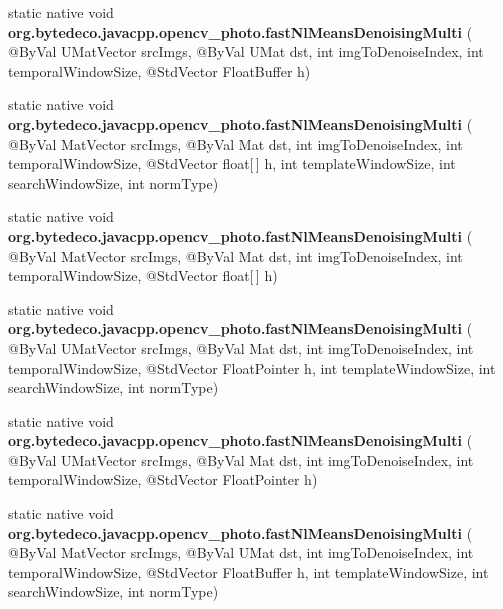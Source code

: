 \begin{DoxyCompactItemize}
\item 
\mbox{\label{group__photo__denoise_ga49b37d9587d0f6964fc23e71b349bc34}} 
static native void {\bfseries org.\+bytedeco.\+javacpp.\+opencv\+\_\+photo.\+fast\+Nl\+Means\+Denoising\+Multi} ( @By\+Val U\+Mat\+Vector src\+Imgs, @By\+Val U\+Mat dst, int img\+To\+Denoise\+Index, int temporal\+Window\+Size, @Std\+Vector Float\+Buffer h)
\item 
\mbox{\label{group__photo__denoise_ga29658724b489fd90f43a9918c06cd442}} 
static native void {\bfseries org.\+bytedeco.\+javacpp.\+opencv\+\_\+photo.\+fast\+Nl\+Means\+Denoising\+Multi} ( @By\+Val Mat\+Vector src\+Imgs, @By\+Val Mat dst, int img\+To\+Denoise\+Index, int temporal\+Window\+Size, @Std\+Vector float\mbox{[}$\,$\mbox{]} h, int template\+Window\+Size, int search\+Window\+Size, int norm\+Type)
\item 
\mbox{\label{group__photo__denoise_ga6403e7b0af533cf0ea82826d33877cb2}} 
static native void {\bfseries org.\+bytedeco.\+javacpp.\+opencv\+\_\+photo.\+fast\+Nl\+Means\+Denoising\+Multi} ( @By\+Val Mat\+Vector src\+Imgs, @By\+Val Mat dst, int img\+To\+Denoise\+Index, int temporal\+Window\+Size, @Std\+Vector float\mbox{[}$\,$\mbox{]} h)
\item 
\mbox{\label{group__photo__denoise_ga82df6920e1bd487e9a47c396aa5dd25e}} 
static native void {\bfseries org.\+bytedeco.\+javacpp.\+opencv\+\_\+photo.\+fast\+Nl\+Means\+Denoising\+Multi} ( @By\+Val U\+Mat\+Vector src\+Imgs, @By\+Val Mat dst, int img\+To\+Denoise\+Index, int temporal\+Window\+Size, @Std\+Vector Float\+Pointer h, int template\+Window\+Size, int search\+Window\+Size, int norm\+Type)
\item 
\mbox{\label{group__photo__denoise_ga06ad37e3fde65af399ca1ae76282403e}} 
static native void {\bfseries org.\+bytedeco.\+javacpp.\+opencv\+\_\+photo.\+fast\+Nl\+Means\+Denoising\+Multi} ( @By\+Val U\+Mat\+Vector src\+Imgs, @By\+Val Mat dst, int img\+To\+Denoise\+Index, int temporal\+Window\+Size, @Std\+Vector Float\+Pointer h)
\item 
\mbox{\label{group__photo__denoise_gade9285c9fb0b695589185bddd091fc88}} 
static native void {\bfseries org.\+bytedeco.\+javacpp.\+opencv\+\_\+photo.\+fast\+Nl\+Means\+Denoising\+Multi} ( @By\+Val Mat\+Vector src\+Imgs, @By\+Val U\+Mat dst, int img\+To\+Denoise\+Index, int temporal\+Window\+Size, @Std\+Vector Float\+Buffer h, int template\+Window\+Size, int search\+Window\+Size, int norm\+Type)

\end{DoxyCompactItemize}
